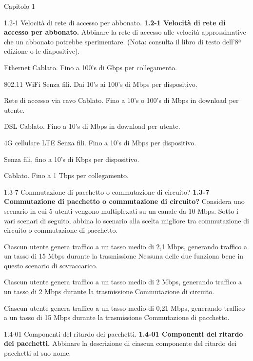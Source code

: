\documentclass[a4paper]{article}
\begin{document}
\begin{quiz}{Capitolo 1}

\begin{matching}[points=1]{1.2-1 Velocità di rete di accesso per abbonato.}
\textbf{1.2-1 Velocità di rete di accesso per abbonato.}
Abbinare la rete di accesso alle velocità approssimative che un abbonato potrebbe sperimentare.
(Nota: consulta il libro di testo dell'8ª edizione o le diapositive).

\item Ethernet \answer Cablato. Fino a 100's di Gbps per collegamento.
\item 802.11 WiFi \answer Senza fili. Dai 10's ai 100's di Mbps per dispositivo.
\item Rete di accesso via cavo \answer Cablato. Fino a 10's o 100's di Mbps in download per utente.
\item DSL \answer Cablato. Fino a 10's di Mbps in download per utente.
\item 4G cellulare LTE \answer Senza fili. Fino a 10's di Mbps per dispositivo.
\item \answer Senza fili, fino a 10's di Kbps per dispositivo.
\item \answer Cablato. Fino a 1 Tbps per collegamento.
\end{matching}

\begin{matching}[points=1]{1.3-7 Commutazione di pacchetto o commutazione di circuito?}
\textbf{1.3-7 Commutazione di pacchetto o commutazione di circuito?}
Considera uno scenario in cui 5 utenti vengono multiplexati su un canale da 10 Mbps.
Sotto i vari scenari di seguito, abbina lo scenario alla scelta migliore tra commutazione di circuito o commutazione di pacchetto.

\item Ciascun utente genera traffico a un tasso medio di 2,1 Mbps, generando traffico a un tasso di 15 Mbps durante la trasmissione \answer Nessuna delle due funziona bene in questo scenario di sovraccarico.
\item Ciascun utente genera traffico a un tasso medio di 2 Mbps, generando traffico a un tasso di 2 Mbps durante la trasmissione \answer Commutazione di circuito.
\item Ciascun utente genera traffico a un tasso medio di 0,21 Mbps, generando traffico a un tasso di 15 Mbps durante la trasmissione \answer Commutazione di pacchetto.
\end{matching}

\begin{matching}[points=1]{1.4-01 Componenti del ritardo dei pacchetti.}
\textbf{1.4-01 Componenti del ritardo dei pacchetti.}
Abbinare la descrizione di ciascun componente del ritardo dei pacchetti al suo nome.


\end{matching}
\end{quiz}
\end{document}
